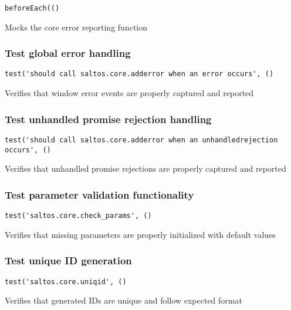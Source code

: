 \documentclass[a4paper]{article}
\begin{document}
\begin{lstlisting}
beforeEach(()
\end{lstlisting}

Mocks the core error reporting function

\hypertarget{toc488}{}
\subsubsection{Test global error handling}

\begin{lstlisting}
test('should call saltos.core.adderror when an error occurs', ()
\end{lstlisting}

Verifies that window error events are properly captured and reported

\hypertarget{toc489}{}
\subsubsection{Test unhandled promise rejection handling}

\begin{lstlisting}
test('should call saltos.core.adderror when an unhandledrejection occurs', ()
\end{lstlisting}

Verifies that unhandled promise rejections are properly captured and reported

\hypertarget{toc490}{}
\subsubsection{Test parameter validation functionality}

\begin{lstlisting}
test('saltos.core.check_params', ()
\end{lstlisting}

Verifies that missing parameters are properly initialized with default values

\hypertarget{toc491}{}
\subsubsection{Test unique ID generation}

\begin{lstlisting}
test('saltos.core.uniqid', ()
\end{lstlisting}

Verifies that generated IDs are unique and follow expected format
\end{document}
